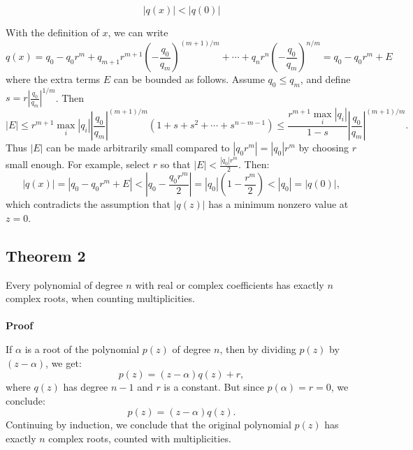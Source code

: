 \[|q(x)| < |q(0)|\]

With the definition of \(x\), we can write
\[
	q(x) = q_0 - q_0 r^m + q_{m+1} r^{m+1} {\left(-\frac{q_0}{q_m}\right)}^{(m+1)/m} + \cdots + q_n r^n {\left(-\frac{q_0}{q_m}\right)}^{n/m} = q_0 - q_0 r^m + E
\]
where the extra terms \(E\) can be bounded as follows. Assume \(q_0 \leq q_m\), and define \(s = r \left|\frac{q_0}{q_m}\right|^{1/m}\). Then
\[
	|E| \leq r^{m+1} \max_i |q_i| \left|\frac{q_0}{q_m}\right|^{(m+1)/m} (1 + s + s^2 + \cdots + s^{n - m - 1}) \leq \frac{r^{m+1} \max_i |q_i|}{1 - s} \left|\frac{q_0}{q_m}\right|^{(m+1)/m}.
\]
Thus \(|E|\) can be made arbitrarily small compared to \(|q_0 r^m| = |q_0| r^m\) by choosing \(r\) small enough. For example, select \(r\) so that \(|E| < \frac{|q_0| r^m}{2}\). Then:
\[
	|q(x)| = |q_0 - q_0 r^m + E| < |q_0 - \frac{q_0 r^m}{2}| = |q_0| \left(1 - \frac{r^m}{2}\right) < |q_0| = |q(0)|,
\]
which contradicts the assumption that \(|q(z)|\) has a minimum nonzero value at \(z = 0\).
\QED

\subsection{Theorem 2}
Every polynomial of degree \(n\) with real or complex coefficients has exactly \(n\) complex roots, when counting multiplicities.
\\\\
\textbf{Proof}

If \(\alpha\) is a root of the polynomial \(p(z)\) of degree \(n\), then by dividing \(p(z)\) by \((z - \alpha)\), we get:
\[
	p(z) = (z - \alpha) q(z) + r,
\]
where \(q(z)\) has degree \(n - 1\) and \(r\) is a constant. But since \(p(\alpha) = r = 0\), we conclude:
\[
	p(z) = (z - \alpha) q(z).
\]
Continuing by induction, we conclude that the original polynomial \(p(z)\) has exactly \(n\) complex roots, counted with multiplicities.

\QED
